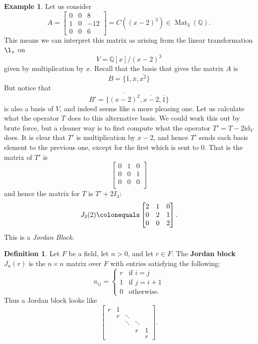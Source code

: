 \documentclass[12pt]{report}
\numberwithin{equation}{section}
\numberwithin{theorem}{chapter}
\theoremstyle{definition}
\newtheorem{definition}[theorem]{Definition}
\newtheorem{example}[theorem]{Example}
\newtheorem*{basic properties}{Basic Properties}
\newtheorem*{Important Remark}{Important Remark}
\newcommand{\df}[1]{{\bf #1}\index{#1}}
\DeclareMathOperator{\M}{Mat}
\begin{document}
\begin{example}\label{example JCF}
Let us consider
$$A =
\begin{bmatrix}
0 & 0 & 8 \\
1 & 0 & -12 \\
0 & 0 & 6 
\end{bmatrix}=C((x-2)^3)\in \M_3(\mathbb{Q}).$$
 This means we can interpret this matrix as arising from the linear transformation $\l_x$ on 
$$V = \mathbb{Q}[x]/(x-2)^3$$
given by multiplication by $x$. Recall that the basis that gives the matrix $A$ is
$$B=\{\overline{1}, \overline{x}, \overline{x^2}\}$$
But notice that 
$$B' = \{\overline{(x-2)^2}, \overline{x-2}, \overline{1}\}$$
is also a basis of $V$, and indeed seems like a more pleasing one. 
Let us calculate what the operator $T$ does to this alternative basis. We could work this out by brute force, but a cleaner way is to first compute what the operator $T' = T -2 \mathrm{id}_V$ does. It is clear that $T'$ is multiplication by $x-2$, and hence $T'$ sends each basis element to the previous one, except for the first which is sent to $0$. That is the matrix of $T'$ is
$$\begin{bmatrix}
0 & 1 & 0 \\
0 & 0 & 1 \\
0 & 0 & 0 \\
\end{bmatrix}$$
and hence the matrix for $T$ is $T' + 2 I_3$:
$$J_3(2) \colonequals 
\begin{bmatrix}
2 & 1 & 0 \\
0 & 2 & 1 \\
0 & 0 & 2 \\
\end{bmatrix}.$$
This is a \emph{Jordan Block}. 
\end{example}

\begin{definition}
Let $F$ be a field, let $n > 0$, and let $r \in F$. The \df{Jordan block} $J_n(r)$ is the $n \times n$ matrix over $F$ with entries satisfying the following:
$$a_{ij} = \begin{cases} 
r & \textrm{if } i=j \\ 
1 & \textrm{if } j=i+1 \\
0 & \textrm{otherwise}.
\end{cases}
$$
Thus a Jordan block looks like
$$\begin{bmatrix}
r & 1 &  \\
& r & \ddots \\
& & \ddots & \ddots\\
& & & r & 1\\
&&&& r	
\end{bmatrix}.
$$
\end{definition}
\end{document}
